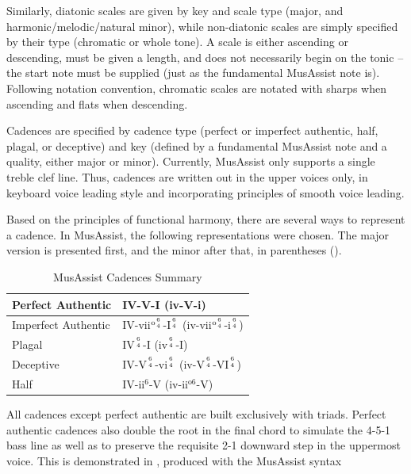 \documentclass{article}
\begin{document}
Similarly, diatonic scales are given by key and scale type (major, and harmonic/melodic/natural minor), while non-diatonic scales are simply specified by their type (chromatic or whole tone). A scale is either ascending or descending, must be given a length, and does not necessarily begin on the tonic -- the start note must be supplied (just as the fundamental MusAssist note is). Following notation convention, chromatic scales are notated with sharps when ascending and flats when descending. 

Cadences are specified by cadence type (perfect or imperfect authentic, half, plagal, 
or deceptive) and key (defined by a fundamental MusAssist note and a quality, either major or minor). 
Currently, MusAssist only supports a single treble clef line. Thus, cadences are written out in the 
upper voices only, in keyboard voice leading style and incorporating principles of smooth voice leading.

Based on the principles of functional harmony, there are several ways to represent a cadence. 
In MusAssist, the following representations were chosen. The major version is presented first, 
and the minor after that, in parentheses ().

\begin{table}[h]
  \begin{center}
    \renewcommand{\arraystretch}{1.5}
\begin{tabular}{|l|l|}
\hline
Perfect Authentic & IV-V-I (iv-V-i) \\ \hline
Imperfect Authentic & IV-vii$^{\text{o}{6 \atop 4}}$-I$^{6 \atop 4}$ (iv-vii$^{\text{o}{6 \atop 4}}$-i$^{6 \atop 4}$) \\ \hline
Plagal & IV$^{6 \atop 4}$-I (iv$^{6 \atop 4}$-I) \\ \hline
Deceptive & IV-V$^{6 \atop 4}$-vi$^{6 \atop 4}$ (iv-V$^{6 \atop 4}$-VI$^{6 \atop 4}$) \\ \hline
Half & IV-ii$^6$-V (iv-ii$^{\text{o}6}$-V) \\ \hline
\end{tabular}
\caption{MusAssist Cadences Summary}\label{table:cadences}
\end{center}
\vspace{-7mm}
\end{table}

All cadences except perfect authentic are built exclusively with triads.
Perfect authentic cadences also double the root in the final chord to simulate the 4-5-1 bass line
as well as to preserve the requisite 2-1 downward step in the uppermost voice. 
This is demonstrated in , produced with the MusAssist syntax
\end{document}
